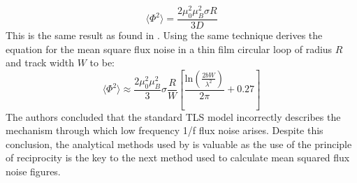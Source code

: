 \begin{equation}
    \langle \Phi^2 \rangle = \frac{2\mu_0^2\mu_B^2\sigma R}{3D} 
    \label{eq:MSFNfinal}
\end{equation}
This is the same result as found in \cite{KochModel}. Using the same technique \cite{KochModel} derives the equation for the mean square flux noise in a thin film circular loop of radius $R$ and track width $W$ to be:
\begin{equation}
    \langle \Phi^2 \rangle \approx \frac{2\mu_0^2\mu_B^2}{3}\sigma\frac{R}{W}[\frac{\text{ln}(\frac{2bW}{\lambda^2}) }{2\pi}+ 0.27] 
    \label{eq:ThinFilmMSFN}
\end{equation}
The authors concluded that the standard TLS model incorrectly describes the mechanism through which low frequency 1/f flux noise arises. Despite this conclusion, the analytical methods used by \cite{KochModel} is valuable as the use of the principle of reciprocity is the key to the next method used to calculate mean squared flux noise figures.

